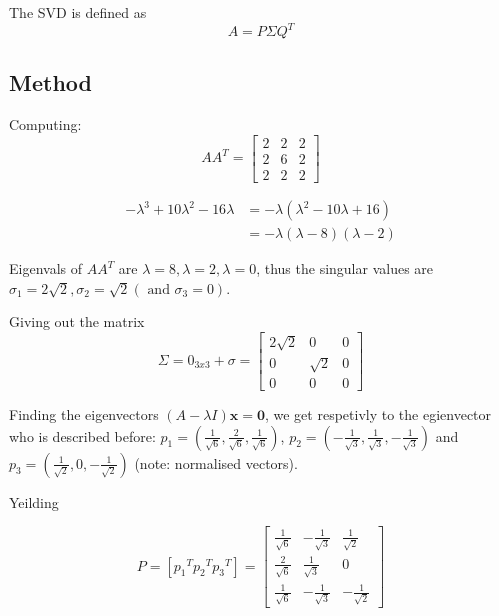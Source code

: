 \documentclass[a4paper]{article}
\begin{document}
The SVD is defined as
$$
A=P \Sigma Q^{T}
$$

\subsection*{Method}
\label{sec-3-1}
Computing:
$$
A A^{T}=\left[\begin{array}{lll}{2} & {2} & {2} \\ {2} & {6} & {2} \\ {2} & {2} & {2}\end{array}\right]
$$

\begin{equation}
\begin{aligned}
-\lambda^{3}+10 \lambda^{2}-16 \lambda &=-\lambda\left(\lambda^{2}-10 \lambda+16\right) \\
 &=-\lambda(\lambda-8)(\lambda-2) 
\end{aligned}
\end{equation}


Eigenvals of $A A^{T}$ are $\lambda=8, \lambda=2, \lambda=0$, thus the singular values
 are $\sigma_{1}=2 \sqrt{2}, \sigma_{2}=\sqrt{2}\left(\text { and } \sigma_{3}=0\right)$.


Giving out the matrix
$$
\Sigma= 0_{3x3}+\sigma=
\left[\begin{array}{ccc}{2 \sqrt{2}} & {0} & {0} \\ {0} & {\sqrt{2}} & {0} \\ {0} & {0} & {0}\end{array}\right]
$$


Finding the eigenvectors $(A-\lambda I) \mathbf{x}=\mathbf{0}$, we get respetivly to the egienvector
 who is described before: $p_{1}=\left(\frac{1}{\sqrt{6}}, \frac{2}{\sqrt{6}}, \frac{1}{\sqrt{6}}\right)$,
 $p_{2}=\left(-\frac{1}{\sqrt{3}}, \frac{1}{\sqrt{3}},-\frac{1}{\sqrt{3}}\right)$ and 
$p_{3}=\left(\frac{1}{\sqrt{2}}, 0,-\frac{1}{\sqrt{2}}\right)$ (note: normalised vectors).

Yeilding

$$
P= \left[  {p_1}^T {p_2}^T {p_3}^T     \right]
=\left[\begin{array}{ccc}{\frac{1}{\sqrt{6}}} & {-\frac{1}{\sqrt{3}}} & {\frac{1}{\sqrt{2}}} \\ {\frac{2}{\sqrt{6}}} & {\frac{1}{\sqrt{3}}} & {0} \\ {\frac{1}{\sqrt{6}}} & {-\frac{1}{\sqrt{3}}} & {-\frac{1}{\sqrt{2}}}\end{array}\right]
$$
\end{document}
